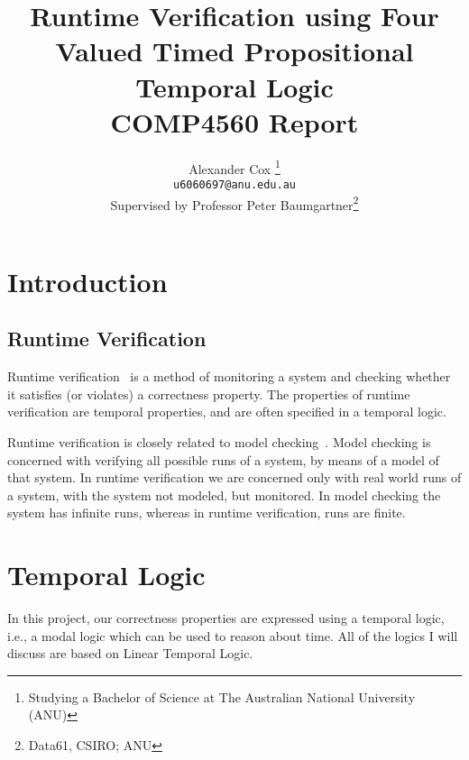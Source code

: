 \documentclass[a4paper]{article}
\title{
  Runtime Verification using Four Valued Timed Propositional Temporal Logic\\
  \normalsize{} COMP4560 Report
}
\author{
  Alexander Cox
  \thanks{Studying a Bachelor of Science at The Australian National University (ANU)}\\
  \small\texttt{u6060697@anu.edu.au}\\
  \normalsize{}Supervised by Professor Peter Baumgartner\thanks{Data61, CSIRO\@; ANU}
}
\begin{document}
\maketitle

\begin{abstract}
\end{abstract}
\newpage

\section{Introduction}
\subsection{Runtime Verification}
Runtime verification~\autocite{colin2005rv} is a method of monitoring a system and checking whether it satisfies (or violates) a correctness property.
The properties of runtime verification are temporal properties, and are often specified in a temporal logic. %

Runtime verification is closely related to model checking~\autocite{baier2008principles}. Model checking is concerned with verifying all possible runs of a system, by means of a model of that system. In runtime verification we are concerned only with real world runs of a system, with the system not modeled, but monitored. In model checking the system has infinite runs, whereas in runtime verification, runs are finite.

\section{Temporal Logic}
In this project, our correctness properties are expressed using a temporal logic, i.e., a modal logic which can be used to reason about time. All of the logics I will discuss are based on Linear Temporal Logic.
\end{document}

